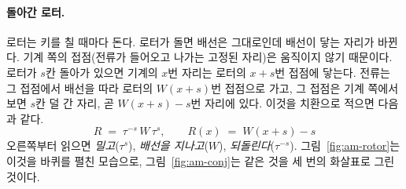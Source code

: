 \paragraph{돌아간 로터.} 로터는 키를 칠 때마다 돈다. 로터가 돌면 배선은 그대로인데 배선이 닿는 자리가 바뀐다.
기계 쪽의 접점(전류가 들어오고 나가는 고정된 자리)은 움직이지 않기 때문이다. 로터가 $s$칸 돌아가 있으면 기계의
$x$번 자리는 로터의 $x+s$번 접점에 닿는다. 전류는 그 접점에서 배선을 따라 로터의 $W(x+s)$번 접점으로 가고, 그
접점은 기계 쪽에서 보면 $s$칸 덜 간 자리, 곧 $W(x+s)-s$번 자리에 있다. 이것을 치환으로 적으면 다음과 같다.
\begin{equation}
  R \;=\; \tau^{-s}\, W\, \tau^{s}, \qquad R(x) \;=\; W(x+s) - s \label{eq:am-rotor}
\end{equation}
오른쪽부터 읽으면 \emph{밀고}($\tau^{s}$), \emph{배선을 지나고}($W$), \emph{되돌린다}($\tau^{-s}$).
그림~\ref{fig:am-rotor}는 이것을 바퀴를 펼친 모습으로, 그림~\ref{fig:am-conj}는 같은 것을 세 번의 화살표로 그린
것이다.

